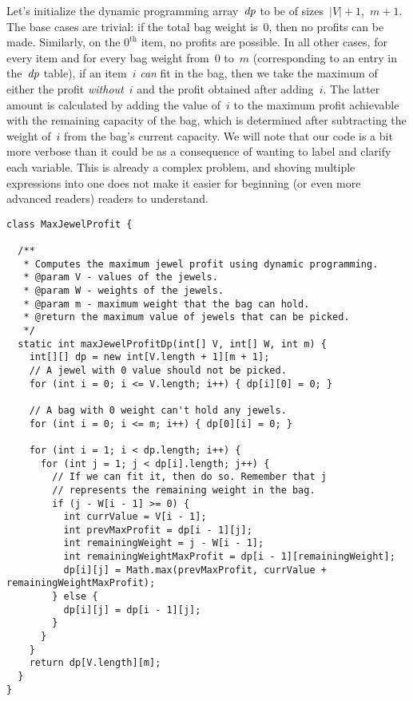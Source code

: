 Let's initialize the dynamic programming array~$\emph{dp}$ to be of sizes~$|V|+1$,~$m+1$. 
The base cases are trivial: if the total bag weight is~$0$, then no profits can be made. 
Similarly, on the $0^\text{th}$ item, no profits are possible.
In all other cases, for every item and for every bag weight from~$0$ to~$m$ (corresponding to an entry in the~$\emph{dp}$ table), if an item~$i$ \emph{can} fit in the bag, then we take the maximum of either the profit \emph{without}~$i$ and the profit obtained after adding~$i$.
The latter amount is calculated by adding the value of~$i$ to the maximum profit achievable with the remaining capacity of the bag, which is determined after subtracting the weight of~$i$ from the bag's current capacity.
We will note that our code is a bit more verbose than it could be as a consequence of wanting to label and clarify each variable.
This is already a complex problem, and shoving multiple expressions into one does not make it easier for beginning (or even more advanced readers) readers to understand.

\begin{lstlisting}[language=MyJava]
class MaxJewelProfit {
  
  /**
   * Computes the maximum jewel profit using dynamic programming.
   * @param V - values of the jewels.
   * @param W - weights of the jewels.
   * @param m - maximum weight that the bag can hold.
   * @return the maximum value of jewels that can be picked.
   */
  static int maxJewelProfitDp(int[] V, int[] W, int m) {
    int[][] dp = new int[V.length + 1][m + 1];
    // A jewel with 0 value should not be picked.
    for (int i = 0; i <= V.length; i++) { dp[i][0] = 0; }

    // A bag with 0 weight can't hold any jewels.
    for (int i = 0; i <= m; i++) { dp[0][i] = 0; }

    for (int i = 1; i < dp.length; i++) {
      for (int j = 1; j < dp[i].length; j++) {
        // If we can fit it, then do so. Remember that j 
        // represents the remaining weight in the bag.
        if (j - W[i - 1] >= 0) {
          int currValue = V[i - 1];
          int prevMaxProfit = dp[i - 1][j];
          int remainingWeight = j - W[i - 1];
          int remainingWeightMaxProfit = dp[i - 1][remainingWeight];
          dp[i][j] = Math.max(prevMaxProfit, currValue + remainingWeightMaxProfit);
        } else {
          dp[i][j] = dp[i - 1][j];
        }
      }
    }
    return dp[V.length][m];
  }
}
\end{lstlisting}
